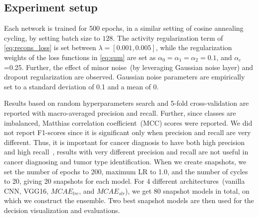 \subsection{Experiment setup}
Each network is trained for 500 epochs, in a similar setting of cosine annealing cycling, by setting batch size to $128$. The activity regularization term of \cref{eq:recons_loss} is set between $\lambda=[0.001, 0.005]$, while the regularization weights of the loss functions in \cref{eq:sum} are set as  $\alpha_{0}=\alpha_{1}=\alpha_{2}=0.1$, and $\alpha_{c}$=0.25. %
Further, the effect of minor noise~(by leveraging Gaussian noise layer) and dropout regularization are  observed. Gaussian noise parameters are empirically set to a standard deviation of 0.1 and a mean of 0. 

\hspace*{3.5mm} Results based on random hyperparameters search and 5-fold cross-validation are reported with macro-averaged precision and recall. Further, since classes are imbalanced, Matthias correlation coefficient~(MCC) scores were reported. We did not report F1-scores since it is significant only when precision and recall are very different. Thus, it is important for cancer diagnosis to have both high precision and high recall~\cite{naulaerts2017precision}, results with very different precision and recall are not useful in cancer diagnosing and tumor type identification. 
When we create snapshots, we set the number of epochs to 200, maximum LR to 1.0, and the number of cycles to 20, giving 20 snapshots for each model. For 4 different architectures~(vanilla CNN, VGG16, $MCAE_{lrc}$, and $MCAE_{slr}$), we get 80 snapshot models in total, on which we construct the ensemble. Two best snapshot models are then used for the decision visualization and evaluations. 

